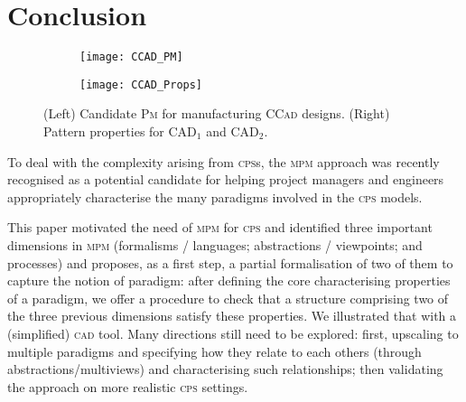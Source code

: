 \section{Conclusion}
\label{sec:Conclusion}


\begin{figure}[t]
\centering
\begin{subfigure}[t]{0.72\linewidth}
\centering
\texttt{[image: CCAD\_PM]}
\label{fig:CCAD-PM-Full}%
\end{subfigure}
\begin{subfigure}[t]{0.23\linewidth}
\centering
\texttt{[image: CCAD\_Props]}
\label{fig:PatternProperties}
\end{subfigure}
\vspace{-1em}
\caption{(Left) Candidate \textsc{Pm} for manufacturing \textsc{CCad} designs.
(Right) Pattern properties for $\mbox{CAD}_1$ and $\mbox{CAD}_2$.}

\vspace{-0.5cm}
\end{figure}

To deal with the complexity arising from \textsc{cps}s, the \textsc{mpm} 
approach was recently recognised as a potential candidate for helping project 
managers and engineers appropriately characterise the many paradigms involved 
in the \textsc{cps} models. 

This paper motivated the need of \textsc{mpm} for \textsc{cps} and identified 
three important dimensions in \textsc{mpm} (formalisms / languages; 
abstractions / viewpoints; and processes) and proposes, as a first step, a 
partial formalisation of two of them to capture the notion of paradigm: after 
defining the core characterising properties of a paradigm, we offer a procedure 
to check that a structure comprising two of the three previous dimensions 
satisfy these properties. We illustrated that with a (simplified) \textsc{cad} 
tool. 
Many directions still need to be explored: first, upscaling to multiple 
paradigms and specifying how they relate to each others (through 
abstractions/multiviews) and characterising such relationships; then validating 
the approach on more realistic \textsc{cps} settings. 


